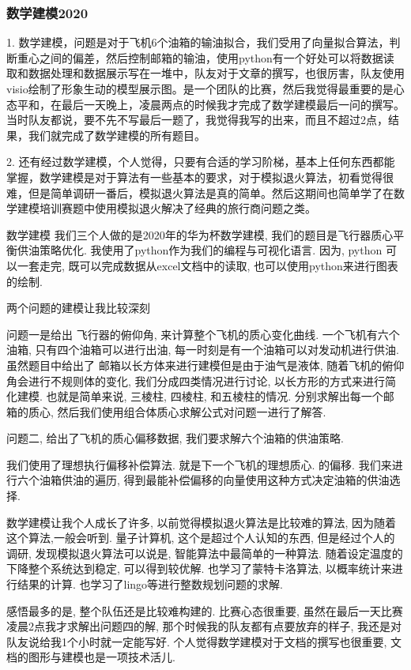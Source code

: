 \documentclass[UTF8]{ctexart}
\begin{document}
\subsubsection{数学建模2020}
1. 数学建模，问题是对于飞机6个油箱的输油拟合，我们受用了向量拟合算法，判断重心之间的偏差，然后控制邮箱的输油，使用python有一个好处可以将数据读取和数据处理和数据展示写在一堆中，队友对于文章的撰写，也很厉害，队友使用visio绘制了形象生动的模型展示图。是一个团队的比赛，然后我觉得最重要的是心态平和，在最后一天晚上，凌晨两点的时候我才完成了数学建模最后一问的撰写。当时队友都说，要不先不写最后一题了，我觉得我写的出来，而且不超过2点，结果，我们就完成了数学建模的所有题目。\par
2. 还有经过数学建模，个人觉得，只要有合适的学习阶梯，基本上任何东西都能掌握，数学建模是对于算法有一些基本的要求，对于模拟退火算法，初看觉得很难，但是简单调研一番后，模拟退火算法是真的简单。然后这期间也简单学了在数学建模培训赛题中使用模拟退火解决了经典的旅行商问题之类。\par

数学建模
我们三个人做的是2020年的华为杯数学建模, 我们的题目是飞行器质心平衡供油策略优化. 我使用了python作为我们的编程与可视化语言. 因为, python 可以一套走完, 既可以完成数据从excel文档中的读取, 也可以使用python来进行图表的绘制. \par


两个问题的建模让我比较深刻\par
问题一是给出 飞行器的俯仰角, 来计算整个飞机的质心变化曲线. 一个飞机有六个油箱, 只有四个油箱可以进行出油, 每一时刻是有一个油箱可以对发动机进行供油. 虽然题目中给出了 邮箱以长方体来进行建模但是由于油气是液体, 随着飞机的俯仰角会进行不规则体的变化, 我们分成四类情况进行讨论, 以长方形的方式来进行简化建模.  也就是简单来说, 三棱柱, 四棱柱, 和五棱柱的情况.  分别求解出每一个邮箱的质心, 然后我们使用组合体质心求解公式对问题一进行了解答. \par
问题二, 给出了飞机的质心偏移数据, 我们要求解六个油箱的供油策略. \par
我们使用了理想执行偏移补偿算法. 就是下一个飞机的理想质心. 的偏移. 我们来进行六个油箱供油的遍历, 得到最能补偿偏移的向量使用这种方式决定油箱的供油选择. \par
数学建模让我个人成长了许多, 以前觉得模拟退火算法是比较难的算法, 因为随着这个算法,一般会听到. 量子计算机, 这个是超过个人认知的东西, 但是经过个人的调研, 发现模拟退火算法可以说是, 智能算法中最简单的一种算法. 随着设定温度的下降整个系统达到稳定, 可以得到较优解. 也学习了蒙特卡洛算法, 以概率统计来进行结果的计算. 也学习了lingo等进行整数规划问题的求解.\par
感悟最多的是, 整个队伍还是比较难构建的. 比赛心态很重要, 虽然在最后一天比赛凌晨2点我才求解出问题四的解, 那个时候我的队友都有点要放弃的样子, 我还是对队友说给我1个小时就一定能写好. 个人觉得数学建模对于文档的撰写也很重要, 文档的图形与建模也是一项技术活儿.\par
\end{document}
